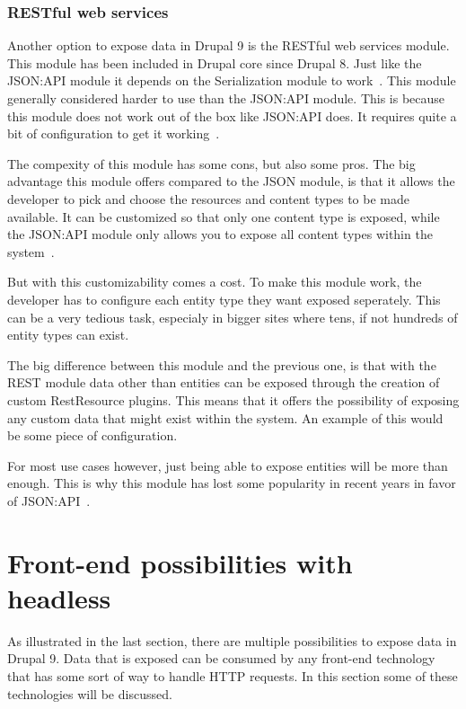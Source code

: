 \subsubsection{RESTful web services}

Another option to expose data in Drupal 9 is the RESTful web services module. This module has been included in Drupal core since Drupal 8. Just like the JSON:API module it depends on the Serialization module to work~\autocite{Drupal2018}.
This module generally considered harder to use than the JSON:API module. This is because this module does not work out of the box like JSON:API does. It requires quite a bit of configuration to get it working~\autocite{Drupal2018}.

The compexity of this module has some cons, but also some pros. The big advantage this module offers compared to the JSON module, is that it allows the developer to pick and choose the resources and content types to be made available. It can be customized so that only one content type is exposed, while the JSON:API module only allows you to expose all content types within the system~\autocite{So2018}. 

But with this customizability comes a cost. To make this module work, the developer has to configure each entity type they want exposed seperately. This can be a very tedious task, especialy in bigger sites where tens, if not hundreds of entity types can exist.

The big difference between this module and the previous one, is that with the REST module data other than entities can be exposed through the creation of custom RestResource plugins. This means that it offers the possibility of exposing any custom data that might exist within the system. An example of this would be some piece of configuration.

For most use cases however, just being able to expose entities will be more than enough. This is why this module has lost some popularity in recent years in favor of JSON:API~\autocite{So2018}.


\section{Front-end possibilities with headless}

As illustrated in the last section, there are multiple possibilities to expose data in Drupal 9. Data that is exposed can be consumed by any front-end technology that has some sort of way to handle HTTP requests. In this section some of these technologies will be discussed.

